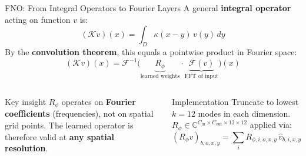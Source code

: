 \documentclass[aspectratio=169, 11pt]{beamer}
\begin{document}
\begin{frame}{FNO: From Integral Operators to Fourier Layers}
  A general \textbf{integral operator} acting on function $v$ is:
  \[
    (\mathcal{K}v)(x) = \int_D \kappa(x-y)\,v(y)\,dy
  \]
  By the \textbf{convolution theorem}, this equals a pointwise product in Fourier space:
  \[
    (\mathcal{K}v)(x)
    = \mathcal{F}^{-1}\!\bigl(\underbrace{R_\phi}_{\text{learned weights}}
      \cdot \underbrace{\mathcal{F}(v)}_{\text{FFT of input}}\bigr)(x)
  \]
  \begin{columns}[t]
      \begin{block}{Key insight}
        $R_\phi$ operates on \textbf{Fourier coefficients} (frequencies), not on
        spatial grid points. The learned operator is therefore valid at
        \textbf{any spatial resolution}.
      \end{block}
      \begin{block}{Implementation}
        Truncate to lowest $k=12$ modes in each dimension.
        $R_\phi \in \mathbb{C}^{C_\text{in}\times C_\text{out}\times 12\times 12}$
        applied via:
        \[
          (R_\phi\hat{v})_{b,o,x,y}
          = \sum_i R_{\phi,i,o,x,y}\,\hat{v}_{b,i,x,y}
        \]
      \end{block}
  \end{columns}
\end{frame}
\end{document}
